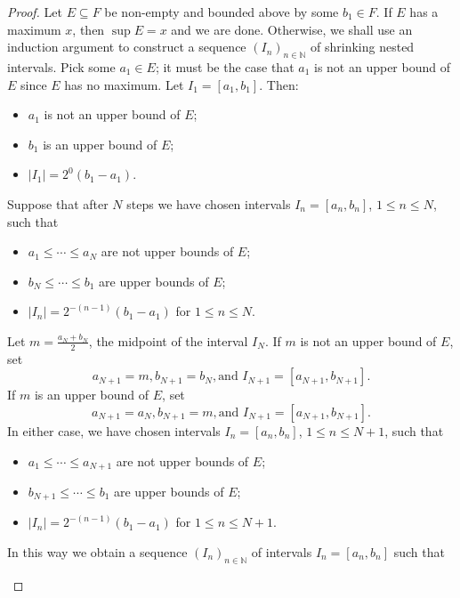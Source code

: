 \documentclass[12pt]{article}
\theoremstyle{definition}
\begin{document}
\begin{proof}
    Let \( E \subseteq F \) be non-empty and bounded above by some \( b_1 \in F \). If \( E \) has a maximum \( x \), then \( \sup E = x \) and we are done. Otherwise, we shall use an induction argument to construct a sequence \( (I_n)_{n \in \mathbb{N}} \) of shrinking nested intervals. Pick some \( a_1 \in E \); it must be the case that \( a_1 \) is not an upper bound of \( E \) since \( E \) has no maximum. Let \( I_1 = [a_1, b_1] \). Then:
    \begin{itemize}
        \item \( a_1 \) is not an upper bound of \( E \);
        \item \( b_1 \) is an upper bound of \( E \);
        \item \( |I_1| = 2^0 (b_1 - a_1) \).
    \end{itemize}
    Suppose that after \( N \) steps we have chosen intervals \( I_n = [a_n, b_n] \), \( 1 \leq n \leq N \), such that
    \begin{itemize}
        \item \( a_1 \leq \cdots \leq a_N \) are not upper bounds of \( E \);
        \item \( b_N \leq \cdots \leq b_1 \) are upper bounds of \( E \);
        \item \( |I_n| = 2^{-(n-1)}(b_1 - a_1) \) for \( 1 \leq n \leq N \).
    \end{itemize}
    Let \( m = \tfrac{a_N + b_N}{2} \), the midpoint of the interval \( I_N \). If \( m \) is not an upper bound of \( E \), set
    \[
        a_{N+1} = m, b_{N+1} = b_N, \text{and } I_{N+1} = [a_{N+1}, b_{N+1}].
    \]
    If \( m \) is an upper bound of \( E \), set
    \[
        a_{N+1} = a_N, b_{N+1} = m, \text{and } I_{N+1} = [a_{N+1}, b_{N+1}].
    \]
    In either case, we have chosen intervals \( I_n = [a_n, b_n] \), \( 1 \leq n \leq N + 1 \), such that
    \begin{itemize}
        \item \( a_1 \leq \cdots \leq a_{N+1} \) are not upper bounds of \( E \);
        \item \( b_{N+1} \leq \cdots \leq b_1 \) are upper bounds of \( E \);
        \item \( |I_n| = 2^{-(n-1)}(b_1 - a_1) \) for \( 1 \leq n \leq N + 1 \).
    \end{itemize}
    In this way we obtain a sequence \( (I_n)_{n \in \mathbb{N}} \) of intervals \( I_n = [a_n, b_n] \) such that
    \begin{itemize}

\end{itemize}
\end{proof}
\end{document}

